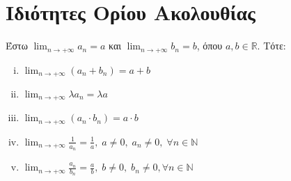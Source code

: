 \documentclass[a4paper,table]{report}
\begin{document}

\section{Ιδιότητες Ορίου Ακολουθίας}

\begin{mybox3}
  \begin{prop}
    Έστω $ \lim_{n \to +\infty} a_{n} = a$ και $ \lim_{n \to +\infty} 
    b_{n} = b $, όπου $ a,b \in \mathbb{R} $. Τότε:
    \begin{enumerate}[i)]
      \item $ \lim_{n \to +\infty} (a_{n} + b_{n}) = a+b $
      \item $ \lim_{n \to +\infty} \lambda a_{n}= \lambda a $
      \item $ \lim_{n \to +\infty} (a_{n}\cdot b_{n}) = a\cdot b $
      \item $ \lim_{n \to +\infty} \frac{1}{a_{n}} = \frac{1}{a},
        \; a \neq 0, \; a_{n} \neq 0, \; \forall n \in \mathbb{N}  $
      \item $ \lim_{n \to +\infty} \frac{a_{n}}{b_{n}} = \frac{a}{b},
        \; b \neq 0, \; b_{n} \neq 0, \forall n \in \mathbb{N} $
    \end{enumerate}
  \end{prop}
\end{mybox3}
\end{document}
